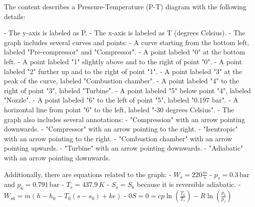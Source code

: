 The content describes a Pressure-Temperature (P-T) diagram with the following details:

- The y-axis is labeled as P.
- The x-axis is labeled as T (degrees Celsius).
- The graph includes several curves and points:
  - A curve starting from the bottom left, labeled "Pre-compressor" and "Compressor".
  - A point labeled "0" at the bottom left.
  - A point labeled "1" slightly above and to the right of point "0".
  - A point labeled "2" further up and to the right of point "1".
  - A point labeled "3" at the peak of the curve, labeled "Combustion chamber".
  - A point labeled "4" to the right of point "3", labeled "Turbine".
  - A point labeled "5" below point "4", labeled "Nozzle".
  - A point labeled "6" to the left of point "5", labeled "0.197 bar".
  - A horizontal line from point "6" to the left, labeled "-30 degrees Celsius".
- The graph also includes several annotations:
  - "Compression" with an arrow pointing downwards.
  - "Compressor" with an arrow pointing to the right.
  - "Isentropic" with an arrow pointing to the right.
  - "Combustion chamber" with an arrow pointing upwards.
  - "Turbine" with an arrow pointing downwards.
  - "Adiabatic" with an arrow pointing downwards.

Additionally, there are equations related to the graph:
- \( W_s = 220 \frac{m}{s} \)
- \( p_s = 0.3 \, \text{bar} \) and \( p_6 = 0.791 \, \text{bar} \)
- \( T_s = 437.9 \, K \)
- \( S_s = S_6 \) because it is reversible adiabatic.
- \( W_{s6} = \dot{m} (h - h_0 - T_0 (s - s_0) + ke) \)
- \( 0S = 0 = cp \ln \left( \frac{T_6}{T_s} \right) - R \ln \left( \frac{p_6}{p_s} \right) \)